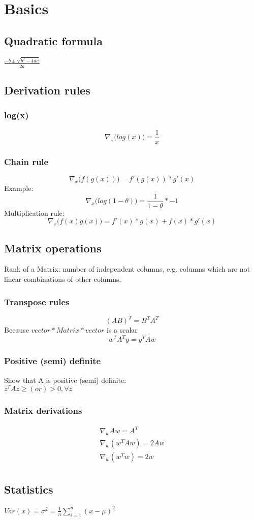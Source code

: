 \section{Basics}
\subsection{Quadratic formula}
$\frac{-b \pm \sqrt{b^{2}-4ac}}{2a}$
\subsection{Derivation rules}
\subsubsection{log(x)}
\begin{equation}
	\nabla_{x}\big( log(x) \big) = \frac{1}{x}
\end{equation}
\subsubsection{Chain rule}
\begin{equation}
	\nabla_{x}\big( f(g(x)) \big) = f'(g(x))*g'(x)
\end{equation}
Example:
\begin{equation}
	\nabla_{x}\big( log(1-\theta) \big) = \frac{1}{1-\theta}*- 1
\end{equation}
Multiplication rule:
\begin{equation}
	\nabla_{x}\big( f(x)g(x) \big) = f'(x)*g(x) + f(x)*g'(x)
\end{equation}
\subsection{Matrix operations}
Rank of a Matrix: number of independent columns, e.g. columns which are not linear
combinations of other columns.
\subsubsection{Transpose rules}
\begin{equation}
	(AB)^{T}= B^{T}A^{T}
\end{equation}
Because $vector * Matrix * vector$ is a scalar
\begin{equation}
	w^{T}A^{T}y = y^{T}Aw
\end{equation}
\subsubsection{Positive (semi) definite}
\small Show that A is positive (semi) definite:\\
$z^{T}Az \geq (or) > 0, \forall z$\\
\subsubsection{Matrix derivations}
\begin{equation}
	\begin{aligned}
		\nabla_{w}Aw = A^T\\ \nabla_w(w^{T}Aw) = 2Aw\\ \nabla_w(w^{T}w) = 2w\\
	\end{aligned}
\end{equation}
\subsection{Statistics}
$Var(x) = \sigma^{2}= \frac{1}{n}\sum_{i=1}^{n}(x-\mu)^{2}$